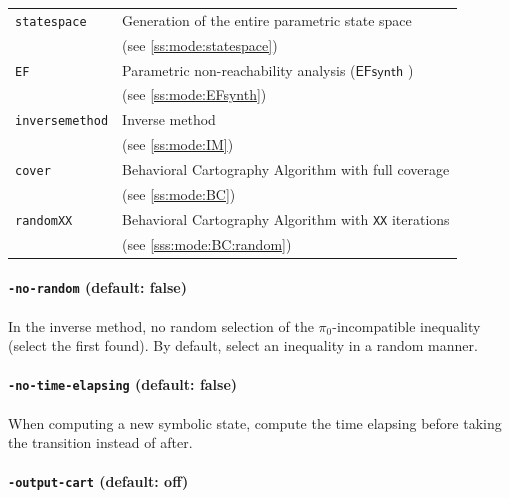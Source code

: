 \documentclass[a4paper,11pt]{report}
\newcommand{\pio}{\pi_0}
\newcommand{\EFsynth}{\ensuremath{\mathsf{EFsynth}}}
\newcommand{\styleOption}[1]{\textcolor{optioncolor}{\texttt{#1}}}
\begin{document}
\begin{tabular}{@{} l @{\ \ } l}
	\styleOption{statespace} & Generation of the entire parametric state space \\
	& (see \cref{ss:mode:statespace}) \\
	
	\styleOption{EF} & Parametric non-reachability analysis (\EFsynth{} \cite{JLR15}) \\
	& (see \cref{ss:mode:EFsynth}) \\
	
	\styleOption{inversemethod} & Inverse method \\
	& (see \cref{ss:mode:IM}) \\
	
	\styleOption{cover} & Behavioral Cartography Algorithm with full coverage \\
	& (see \cref{ss:mode:BC}) \\
	
	\styleOption{randomXX} & Behavioral Cartography Algorithm with \styleOption{XX} iterations \\
	& (see \cref{sss:mode:BC:random}) \\
\end{tabular}



\paragraph{\styleOption{-no-random} (default: false)}
In the inverse method, no random selection of the $\pio$-incompatible inequality (select the first found).
By default, select an inequality in a random manner.


\paragraph{\styleOption{-no-time-elapsing} (default: false)}
When computing a new symbolic state, compute the time elapsing before taking the transition instead of after.



\paragraph{\styleOption{-output-cart} (default: off)}
\end{document}

